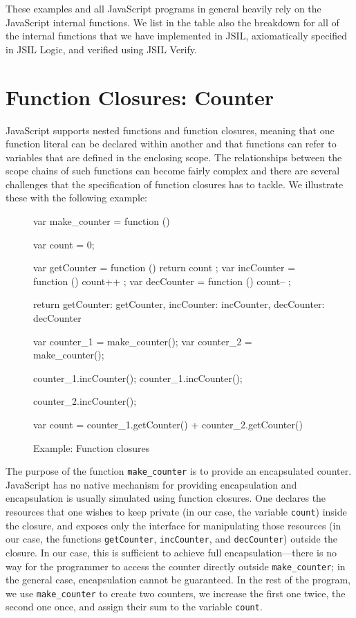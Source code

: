 \documentclass{article}
\def\jsinline{\lstinline[language=JavaScript, basicstyle=\small]}
\begin{document}
These examples and all JavaScript programs in general heavily rely on the JavaScript internal functions. We list in the table also the breakdown for all of the internal functions that we have implemented in JSIL, axiomatically specified in JSIL Logic, and verified using JSIL Verify.

\newpage
\section{Function Closures: Counter}
\label{sec:closures}

JavaScript supports nested functions and function closures, meaning that one function literal can be declared within another and that functions can refer to variables that are defined in the enclosing scope. 
The relationships between the scope chains of such functions can become fairly complex and there are several challenges that the specification of function closures has to tackle. We illustrate these with the following example:

\begin{figure}[!h]
\centering
\begin{minipage}{0.75\textwidth}
\begin{lstjs}[firstnumber=1]
var make_counter = function () {
   var count = 0;

   var getCounter = function () { return count };
   var incCounter = function () { count++ };
   var decCounter = function () { count-- };

   return { getCounter: getCounter, incCounter: incCounter, decCounter: decCounter }
}

var counter_1 = make_counter();
var counter_2 = make_counter();

counter_1.incCounter();
counter_1.incCounter();

counter_2.incCounter();

var count = counter_1.getCounter() + counter_2.getCounter()
\end{lstjs}
\end{minipage}
\caption{Example: Function closures}
\label{fig:fc}
\end{figure}

The purpose of the function \jsinline|make_counter| is to provide an encapsulated counter. JavaScript has no native mechanism for providing encapsulation and encapsulation is usually simulated using function closures. One declares the resources that one wishes to keep private (in our case, the variable \jsinline|count|) inside the closure, and exposes only the interface for manipulating those resources (in our case, the functions \jsinline|getCounter|, \jsinline|incCounter|, and \jsinline|decCounter|) outside the closure. In our case, this is sufficient to achieve full encapsulation---there is no way for the programmer to access the counter directly outside \jsinline|make_counter|; in the general case, encapsulation cannot be guaranteed. In the rest of the program, we use \jsinline|make_counter| to create two counters, we increase the first one twice, the second one once, and assign their sum to the variable \jsinline|count|.
\end{document}
